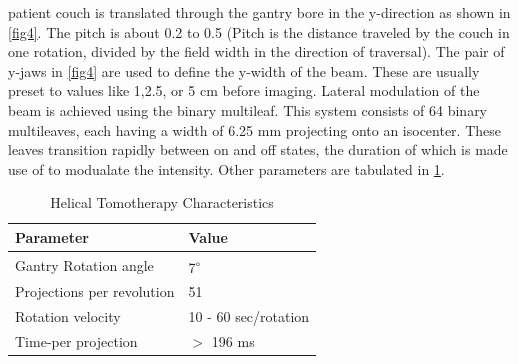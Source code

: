 \documentclass[10pt,journal,compsoc]{IEEEtran} %
\begin{document}
  patient couch is translated through the gantry bore in the y-direction as 
  shown in \ref{fig4}\protect{}. The pitch is about 0.2 to 0.5 
  (Pitch is the distance traveled by the couch in one rotation, divided by the 
  field width in the direction of traversal). The pair of y-jaws in 
  \ref{fig4}\protect{} are used to define the y-width of the beam. 
  These are usually preset to values like 1,2.5, or 5 cm before imaging. 
  Lateral modulation of the beam is achieved using the binary multileaf. This 
  system consists of 64 binary multileaves, each having a width of 6.25 mm 
  projecting onto an isocenter. These leaves transition rapidly between on 
  and off states, the duration of which is made use of to modualate the 
  intensity. Other parameters are tabulated in \ref{tab1}.
  \begin{table}[t]
    \centering
    \caption{Helical Tomotherapy Characteristics}
    \begin{tabularx}{1\linewidth}{XX}
      \toprule[0.3mm]
      \textbf{Parameter} & \textbf{Value} \\
      \midrule
      Gantry Rotation angle & 
      7\textsuperscript{$\circ$} \\
      Projections per revolution & 51 \\
      Rotation velocity & 10 - 60 sec/rotation \\
      Time-per projection & $>$ 196 ms \\
      \bottomrule
    \end{tabularx}%
    \label{tab1}%
  \end{table}%
\end{document}
